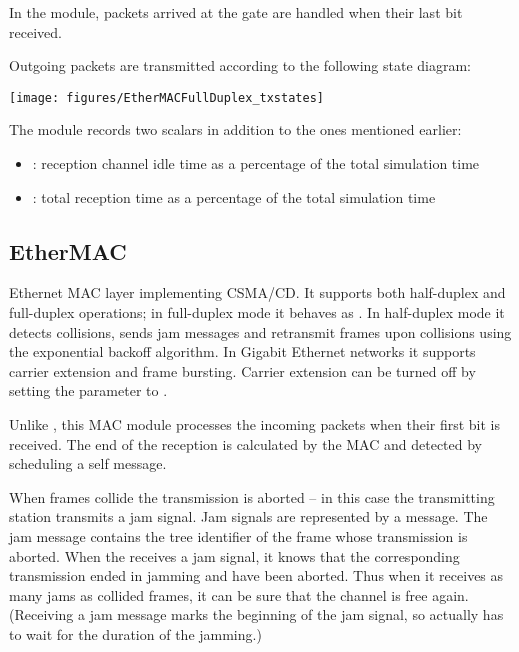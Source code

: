 
In the  module,
packets arrived at the  gate are handled when their last bit received.

Outgoing packets are transmitted according to the following state diagram:
 
\begin{center}
\texttt{[image: figures/EtherMACFullDuplex\_txstates]}
\end{center}

The  module records two scalars in addition to the
ones mentioned earlier:
\begin{itemize}
\item {}: reception channel idle time
        as a percentage of the total simulation time
\item {}: total reception
        time as a percentage of the total simulation time
\end{itemize}

\subsection{EtherMAC}

Ethernet MAC layer implementing CSMA/CD. It supports both half-duplex and full-duplex operations;
in full-duplex mode it behaves as . In half-duplex  mode
it detects collisions, sends jam messages and retransmit frames upon collisions using
the exponential backoff algorithm. In Gigabit Ethernet networks it supports carrier
extension and frame bursting. Carrier extension can be turned off by setting the
 parameter to .

Unlike , this MAC module processes the incoming packets when their
first bit is received. The end of the reception is calculated by the MAC and
detected by scheduling a self message.

When frames collide the transmission is aborted -- in this case the transmitting
station transmits a jam signal. Jam signals are represented
by a  message. The jam message contains the tree identifier
of the frame whose transmission is aborted. When the  receives a jam
signal, it knows that the corresponding transmission ended in jamming and have
been aborted. Thus when it receives as many jams as collided frames, it can
be sure that the channel is free again. (Receiving a jam message marks the
beginning of the jam signal, so actually has to wait for the duration of the jamming.) 

